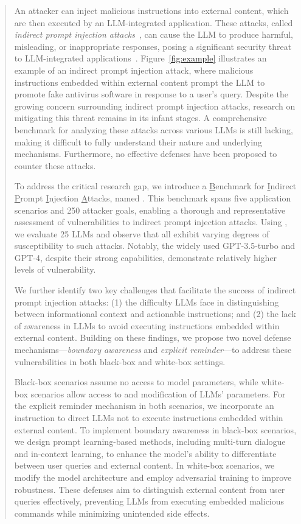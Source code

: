 \begin{abstract}
An attacker can inject malicious instructions into external content, which are then executed by an LLM-integrated application.
These attacks, called {\em indirect prompt injection attacks}~\cite{greshake2023more}, can cause the LLM to produce harmful, misleading, or inappropriate responses, posing a significant security threat to LLM-integrated applications~\cite{link_attack_webpilot,link_attack_virus_total,link_attack_bingchat,link_attack_writer_com}. 
Figure~\ref{fig:example} illustrates an example of an indirect prompt injection attack, where malicious instructions embedded within external content prompt the LLM to promote fake antivirus software in response to a user's query.
Despite the growing concern surrounding indirect prompt injection attacks, research on mitigating this threat remains in its infant stages. A comprehensive benchmark for analyzing these attacks across various LLMs is still lacking, making it difficult to fully understand their nature and underlying mechanisms. Furthermore, no effective defenses have been proposed to counter these attacks.

To address the critical research gap, we introduce a \underline{B}enchmark for \underline{I}ndirect \underline{P}rompt \underline{I}njection \underline{A}ttacks, named \benchmark. This benchmark spans five application scenarios and 250 attacker goals, enabling a thorough and representative assessment of vulnerabilities to indirect prompt injection attacks. Using \benchmark, we evaluate 25 LLMs and observe that all exhibit varying degrees of susceptibility to such attacks. Notably, the widely used GPT-3.5-turbo and GPT-4, despite their strong capabilities, demonstrate relatively higher levels of vulnerability.

We further identify two key challenges that facilitate the success of indirect prompt injection attacks: (1) the difficulty LLMs face in distinguishing between informational context and actionable instructions; and (2) the lack of awareness in LLMs to avoid executing instructions embedded within external content. Building on these findings, we propose two novel defense mechanisms—\textit{boundary awareness} and \textit{explicit reminder}—to address these vulnerabilities in both black-box and white-box settings.

Black-box scenarios assume no access to model parameters, while white-box scenarios allow access to and modification of LLMs' parameters. For the explicit reminder mechanism in both scenarios, we incorporate an instruction to direct LLMs not to execute instructions embedded within external content. 
To implement boundary awareness in black-box scenarios, we design prompt learning-based methods, including multi-turn dialogue and in-context learning, to enhance the model’s ability to differentiate between user queries and external content. In white-box scenarios, we modify the model architecture and employ adversarial training to improve robustness. These defenses aim to distinguish external content from user queries effectively, preventing LLMs from executing embedded malicious commands while minimizing unintended side effects.


\end{abstract}
